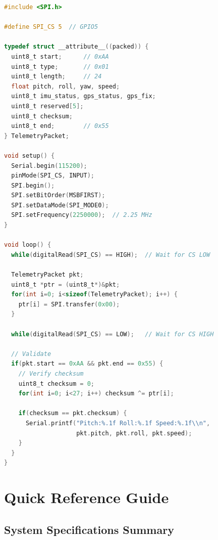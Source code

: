 \documentclass[11pt,a4paper]{article}
\begin{document}
\begin{lstlisting}[language=C]
#include <SPI.h>

#define SPI_CS 5  // GPIO5

typedef struct __attribute__((packed)) {
  uint8_t start;      // 0xAA
  uint8_t type;       // 0x01
  uint8_t length;     // 24
  float pitch, roll, yaw, speed;
  uint8_t imu_status, gps_status, gps_fix;
  uint8_t reserved[5];
  uint8_t checksum;
  uint8_t end;        // 0x55
} TelemetryPacket;

void setup() {
  Serial.begin(115200);
  pinMode(SPI_CS, INPUT);
  SPI.begin();
  SPI.setBitOrder(MSBFIRST);
  SPI.setDataMode(SPI_MODE0);
  SPI.setFrequency(2250000);  // 2.25 MHz
}

void loop() {
  while(digitalRead(SPI_CS) == HIGH);  // Wait for CS LOW
  
  TelemetryPacket pkt;
  uint8_t *ptr = (uint8_t*)&pkt;
  for(int i=0; i<sizeof(TelemetryPacket); i++) {
    ptr[i] = SPI.transfer(0x00);
  }
  
  while(digitalRead(SPI_CS) == LOW);   // Wait for CS HIGH
  
  // Validate
  if(pkt.start == 0xAA && pkt.end == 0x55) {
    // Verify checksum
    uint8_t checksum = 0;
    for(int i=0; i<27; i++) checksum ^= ptr[i];
    
    if(checksum == pkt.checksum) {
      Serial.printf("Pitch:%.1f Roll:%.1f Speed:%.1f\\n",
                    pkt.pitch, pkt.roll, pkt.speed);
    }
  }
}
\end{lstlisting}

\section{Quick Reference Guide}

\subsection{System Specifications Summary}
\end{document}
